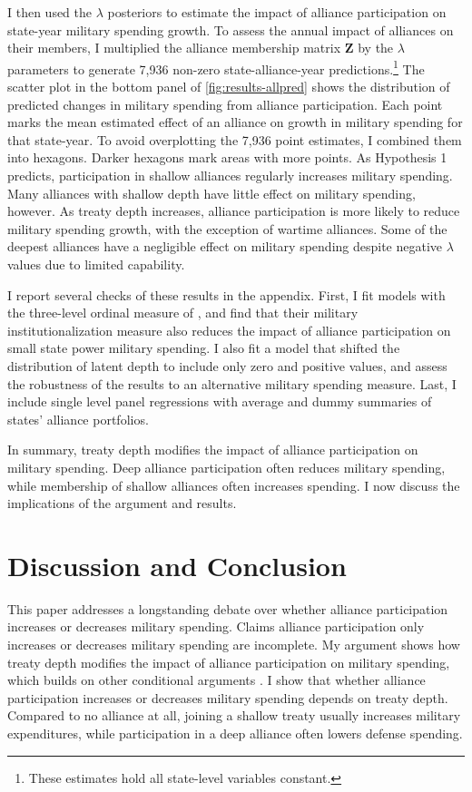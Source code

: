 \documentclass[12pt]{article}
\begin{document}
I then used the $\lambda$ posteriors to estimate the impact of alliance participation on state-year military spending growth. 
To assess the annual impact of alliances on their members, I multiplied the alliance membership matrix $\textbf{Z}$ by the $\lambda$ parameters to generate 7,936 non-zero state-alliance-year predictions.\footnote{These estimates hold all state-level variables constant.} 
The scatter plot in the bottom panel of \autoref{fig:results-allpred} shows the distribution of predicted changes in military spending from alliance participation.
Each point marks the mean estimated effect of an alliance on growth in military spending for that state-year.
To avoid overplotting the 7,936 point estimates, I combined them into hexagons. 
Darker hexagons mark areas with more points. 
As Hypothesis 1 predicts, participation in shallow alliances regularly increases military spending. 
Many alliances with shallow depth have little effect on military spending, however. 
As treaty depth increases, alliance participation is more likely to reduce military spending growth, with the exception of wartime alliances. 
Some of the deepest alliances have a negligible effect on military spending despite negative $\lambda$ values due to limited capability. 


I report several checks of these results in the appendix.
First, I fit models with the three-level ordinal measure of \citep{LeedsAnac2005}, and find that their military institutionalization measure also reduces the impact of alliance participation on small state power military spending. 
I also fit a model that shifted the distribution of latent depth to include only zero and positive values, and assess the robustness of the results to an alternative military spending measure. 
Last, I include single level panel regressions with average and dummy summaries of states' alliance portfolios. 


In summary, treaty depth modifies the impact of alliance participation on military spending.  
Deep alliance participation often reduces military spending, while membership of shallow alliances often increases spending. 
I now discuss the implications of the argument and results. 



\section{Discussion and Conclusion}


This paper addresses a longstanding debate over whether alliance participation increases or decreases military spending. 
Claims alliance participation only increases or decreases military spending are incomplete. 
My argument shows how treaty depth modifies the impact of alliance participation on military spending, which builds on other conditional arguments \citep{DigiuseppePoast2016}. 
I show that whether alliance participation increases or decreases military spending depends on treaty depth. 
Compared to no alliance at all, joining a shallow treaty usually increases military expenditures, while participation in a deep alliance often lowers defense spending. 
\end{document}
